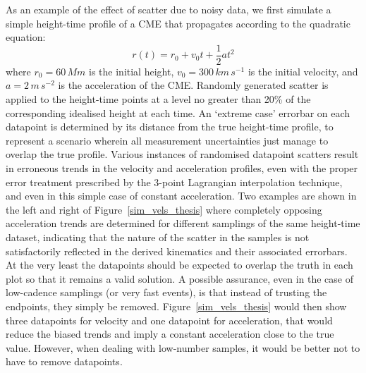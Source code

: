 \documentclass[structabstract]{aa}
\begin{document}
As an example of the effect of scatter due to noisy data, we first simulate a simple height-time profile of a CME that propagates according to the quadratic equation:
\begin{equation}
\label{eqn:const_a}
r(t) = r_0 + v_0 t + \frac{1}{2}a t^2
\end{equation}
where $r_0=60\,Mm$ is the initial height, $v_0=300\,km\,s^{-1}$ is the initial velocity, and $a=2\,m\,s^{-2}$ is the acceleration of the CME. Randomly generated scatter is applied to the height-time points at a level no greater than 20\% of the corresponding idealised height at each time. An `extreme case' errorbar on each datapoint is determined by its distance from the true height-time profile, to represent a scenario wherein all measurement uncertainties just manage to overlap the true profile. Various instances of randomised datapoint scatters result in erroneous trends in the velocity and acceleration profiles, even with the proper error treatment prescribed by the 3-point Lagrangian interpolation technique, and even in this simple case of constant acceleration. Two examples are shown in the left and right of Figure~\ref{sim_vels_thesis} where completely opposing acceleration trends are determined for different samplings of the same height-time dataset, indicating that the nature of the scatter in the samples is not satisfactorily reflected in the derived kinematics and their associated errorbars. At the very least the datapoints should be expected to overlap the truth in each plot so that it remains a valid solution. A possible assurance, even in the case of low-cadence samplings (or very fast events), is that instead of trusting the endpoints, they simply be removed. Figure~\ref{sim_vels_thesis} would then show three datapoints for velocity and one datapoint for acceleration, that would reduce the biased trends and imply a constant acceleration close to the true value. However, when dealing with low-number samples, it would be better not to have to remove datapoints.
\end{document}
